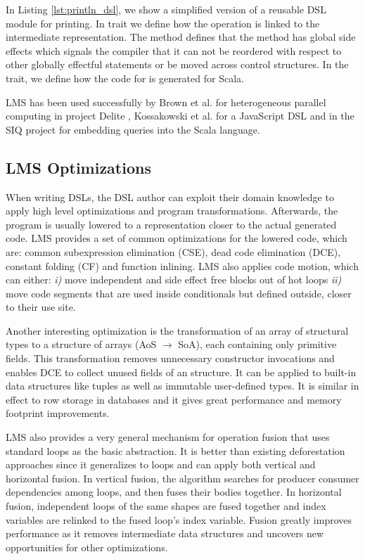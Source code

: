  
In Listing \ref{lst:println_dsl}, we show a simplified version of a reusable DSL
module for printing. In trait  we define how the 
operation is linked to the intermediate representation. The 
method defines that the  method has global side effects which
signals the compiler that it can not be reordered with respect to other globally
effectful statements or be moved across control structures. In the
 trait, we define how the code for  is generated
for Scala.

LMS has been used successfully by Brown et al. for heterogeneous parallel
computing in project Delite \cite{brown_heterogeneous_2011}, Kossakowski et al.
for a JavaScript DSL \cite{greg} and in the SIQ project for embedding queries
into the Scala language.

\subsection{LMS Optimizations}
\label{subsec:lms-optimizations}
When writing DSLs, the DSL author can exploit their domain knowledge to apply
high level optimizations and program transformations. Afterwards, the program is
usually lowered to a representation closer to the actual generated code. LMS
provides a set of common optimizations for the lowered code, which are: common
subexpression elimination (CSE), dead code elimination (DCE), constant folding
(CF) and function inlining. LMS also applies code motion, which can either:
\emph{i)} move independent and side effect free blocks out of hot loops
\emph{ii)} move code segments that are used inside conditionals but defined
outside, closer to their use site.

Another interesting optimization is the transformation of an array of structural
types to a structure of arrays (AoS $\rightarrow$ SoA), each containing only
primitive fields. This transformation removes unnecessary constructor
invocations and enables DCE to collect unused fields of an structure. It can be
applied to built-in data structures like tuples as well as immutable
user-defined types. It is similar in effect to row storage in databases and it
gives great performance and memory footprint improvements.

LMS also provides a very general mechanism for operation fusion that uses
standard loops as the basic abstraction. It is better than existing
deforestation approaches since it generalizes to loops and can apply both
vertical and horizontal fusion. In vertical fusion, the algorithm searches for
producer consumer dependencies among loops, and then fuses their bodies
together. In horizontal fusion, independent loops of the same shapes are fused
together and index variables are relinked to the fused loop's index variable.
Fusion greatly improves performance as it removes intermediate data structures
and uncovers new opportunities for other optimizations.

